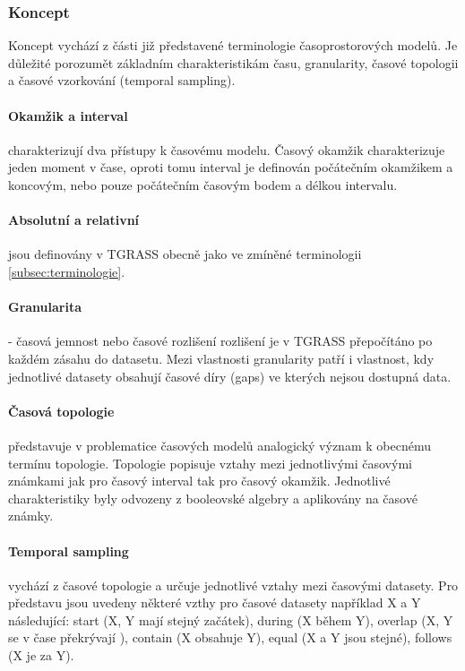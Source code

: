 \documentclass[a4paper,12pt,oneside]{report}
\begin{document}
\subsubsection{Koncept} 
Koncept vychází z části již představené terminologie časoprostorových modelů. Je důležité porozumět základním charakteristikám času, granularity, časové topologii a časové vzorkování (temporal sampling). 

\paragraph*{Okamžik a interval} charakterizují dva přístupy k časovému modelu.  Časový okamžik charakterizuje jeden moment v čase, oproti tomu interval je definován počátečním okamžikem a koncovým, nebo pouze počátečním časovým bodem a délkou intervalu. 

\paragraph*{Absolutní a relativní} jsou definovány v TGRASS obecně jako ve zmíněné terminologii \ref{subsec:terminologie}.

\paragraph*{Granularita} - časová jemnost nebo časové rozlišení rozlišení je v TGRASS přepočítáno po každém zásahu do datasetu. Mezi vlastnosti granularity patří i vlastnost, kdy jednotlivé datasety  obsahují časové díry (gaps) ve kterých nejsou dostupná data.  


\paragraph*{Časová topologie}  představuje v problematice časových modelů analogický význam k obecnému termínu topologie. Topologie popisuje vztahy mezi jednotlivými časovými známkami jak pro časový interval tak pro časový okamžik. Jednotlivé charakteristiky byly odvozeny z booleovské algebry a aplikovány na časové známky.

\paragraph*{Temporal sampling} vychází  z časové topologie a určuje jednotlivé vztahy mezi časovými datasety. Pro představu jsou uvedeny některé vzthy pro časové datasety například X a Y  následující: start (X, Y mají stejný začátek), during (X během Y), overlap (X, Y se v čase překrývají ), contain (X obsahuje Y), equal (X a Y jsou stejné), follows (X je za Y).
\end{document}
